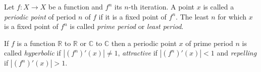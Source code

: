\documentclass[12pt]{article}
\begin{document}
Let $f:X\to X$ be a function and $f^n$ its $n$-th iteration. A point $x$ is called a \textit{periodic point} of period $n$ of $f$ if it is a fixed point of $f^n$. The least $n$ for which $x$ is a fixed point of $f^n$ is called \textit{prime period} or \textit{least period}.

If $f$ is a function  $\mathbb{R}$ to $\mathbb{R}$ or $\mathbb{C}$ to $\mathbb{C}$ then a periodic point $x$ of prime period $n$ is called \textit{hyperbolic} if $|(f^n)'(x)|\neq 1$, \textit{attractive} if $|(f^n)'(x)|<1$ and \textit{repelling} if $|(f^n)'(x)|>1$.
\end{document}
